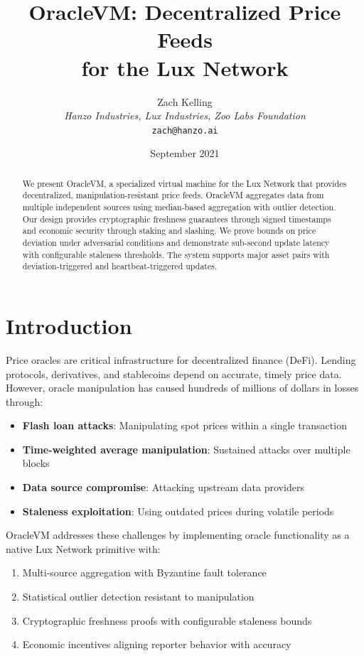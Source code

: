 \documentclass[11pt,a4paper]{article}
\title{\textbf{OracleVM: Decentralized Price Feeds\\for the Lux Network}}
\author{Zach Kelling\\
\textit{Hanzo Industries, Lux Industries, Zoo Labs Foundation}\\
\texttt{zach@hanzo.ai}}
\date{September 2021}
\theoremstyle{definition}
\begin{document}
\maketitle

\begin{abstract}
We present OracleVM, a specialized virtual machine for the Lux Network that provides decentralized, manipulation-resistant price feeds. OracleVM aggregates data from multiple independent sources using median-based aggregation with outlier detection. Our design provides cryptographic freshness guarantees through signed timestamps and economic security through staking and slashing. We prove bounds on price deviation under adversarial conditions and demonstrate sub-second update latency with configurable staleness thresholds. The system supports major asset pairs with deviation-triggered and heartbeat-triggered updates.
\end{abstract}

\section{Introduction}

Price oracles are critical infrastructure for decentralized finance (DeFi). Lending protocols, derivatives, and stablecoins depend on accurate, timely price data. However, oracle manipulation has caused hundreds of millions of dollars in losses through:

\begin{itemize}
    \item \textbf{Flash loan attacks}: Manipulating spot prices within a single transaction
    \item \textbf{Time-weighted average manipulation}: Sustained attacks over multiple blocks
    \item \textbf{Data source compromise}: Attacking upstream data providers
    \item \textbf{Staleness exploitation}: Using outdated prices during volatile periods
\end{itemize}

OracleVM addresses these challenges by implementing oracle functionality as a native Lux Network primitive with:

\begin{enumerate}
    \item Multi-source aggregation with Byzantine fault tolerance
    \item Statistical outlier detection resistant to manipulation
    \item Cryptographic freshness proofs with configurable staleness bounds
    \item Economic incentives aligning reporter behavior with accuracy
\end{enumerate}
\end{document}
